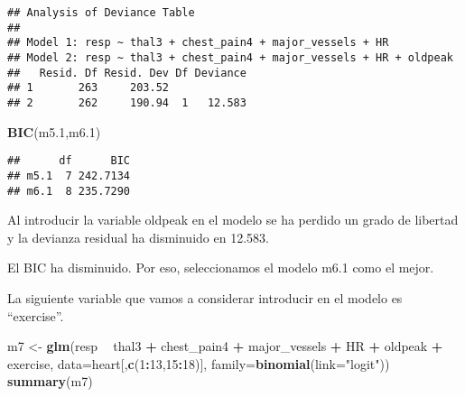 \documentclass[]{article}
\newenvironment{Shaded}{\begin{snugshade}}{\end{snugshade}}
\newcommand{\KeywordTok}[1]{\textcolor[rgb]{0.13,0.29,0.53}{\textbf{#1}}}
\newcommand{\DataTypeTok}[1]{\textcolor[rgb]{0.13,0.29,0.53}{#1}}
\newcommand{\DecValTok}[1]{\textcolor[rgb]{0.00,0.00,0.81}{#1}}
\newcommand{\StringTok}[1]{\textcolor[rgb]{0.31,0.60,0.02}{#1}}
\newcommand{\OperatorTok}[1]{\textcolor[rgb]{0.81,0.36,0.00}{\textbf{#1}}}
\newcommand{\NormalTok}[1]{#1}
\begin{document}
\begin{verbatim}
## Analysis of Deviance Table
## 
## Model 1: resp ~ thal3 + chest_pain4 + major_vessels + HR
## Model 2: resp ~ thal3 + chest_pain4 + major_vessels + HR + oldpeak
##   Resid. Df Resid. Dev Df Deviance
## 1       263     203.52            
## 2       262     190.94  1   12.583
\end{verbatim}

\begin{Shaded}
\begin{Highlighting}[]
\KeywordTok{BIC}\NormalTok{(m5.}\DecValTok{1}\NormalTok{,m6.}\DecValTok{1}\NormalTok{)}
\end{Highlighting}
\end{Shaded}

\begin{verbatim}
##      df      BIC
## m5.1  7 242.7134
## m6.1  8 235.7290
\end{verbatim}

Al introducir la variable oldpeak en el modelo se ha perdido un grado de
libertad y la devianza residual ha disminuido en 12.583.

El BIC ha disminuido. Por eso, seleccionamos el modelo m6.1 como el
mejor.

La siguiente variable que vamos a considerar introducir en el modelo es
``exercise''.

\begin{Shaded}
\begin{Highlighting}[]
\NormalTok{m7 <-}\StringTok{ }\KeywordTok{glm}\NormalTok{(resp }\OperatorTok{~}\StringTok{ }\NormalTok{thal3 }\OperatorTok{+}\StringTok{ }\NormalTok{chest_pain4 }\OperatorTok{+}\StringTok{ }\NormalTok{major_vessels }\OperatorTok{+}\StringTok{ }\NormalTok{HR }\OperatorTok{+}\StringTok{ }\NormalTok{oldpeak }\OperatorTok{+}\StringTok{ }\NormalTok{exercise, }\DataTypeTok{data=}\NormalTok{heart[,}\KeywordTok{c}\NormalTok{(}\DecValTok{1}\OperatorTok{:}\DecValTok{13}\NormalTok{,}\DecValTok{15}\OperatorTok{:}\DecValTok{18}\NormalTok{)], }\DataTypeTok{family=}\KeywordTok{binomial}\NormalTok{(}\DataTypeTok{link=}\StringTok{"logit"}\NormalTok{)) }
\KeywordTok{summary}\NormalTok{(m7)}
\end{Highlighting}
\end{Shaded}
\end{document}
